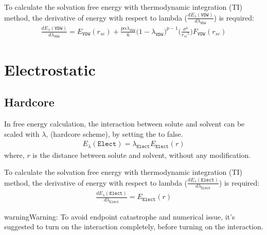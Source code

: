 \documentclass[letterpaper,10pt,english]{sphinxmanual}
\begin{document}
To calculate the solvation free energy with thermodynamic integration (TI) method, the derivative of energy with
respect to lambda (\(\frac{dE_{\lambda}(\texttt{VDW})}{d\lambda_{\texttt{VDW}}}\)) is required:
\begin{equation*}
\begin{split}\frac{dE_{\lambda}(\texttt{VDW})}{d\lambda_{\texttt{VDW}}} = E_{\texttt{VDW}}(r_{sc}) + \frac{p \alpha \lambda_{\texttt{VDW}}}{6} \bigg(1 - \lambda_{\texttt{VDW}}\bigg)^{p-1} \bigg(\frac{{\sigma}^6}{{r_{sc}}^5} \bigg) F_{\texttt{VDW}}(r_{sc})\end{split}
\end{equation*}

\section{Electrostatic}
\label{\detokenize{free_energy:electrostatic}}

\subsection{Hard\sphinxhyphen{}core}
\label{\detokenize{free_energy:hard-core}}
In free energy calculation, the  interaction between solute and solvent can be scaled with \(\lambda\),  (hard\sphinxhyphen{}core scheme),
by setting the  to false.
\begin{equation*}
\begin{split}E_{\lambda}(\texttt{Elect}) = \lambda_{\texttt{Elect}} E_{\texttt{Elect}}(r)\end{split}
\end{equation*}
where, \(r\) is the distance between solute and solvent, without any modification.

To calculate the solvation free energy with thermodynamic integration (TI) method, the derivative of energy with
respect to lambda (\(\frac{dE_{\lambda}(\texttt{Elect})}{d\lambda_{\texttt{Elect}}}\)) is required:
\begin{equation*}
\begin{split}\frac{dE_{\lambda}(\texttt{Elect})}{d\lambda_{\texttt{Elect}}} = E_{\texttt{Elect}}(r)\end{split}
\end{equation*}
\begin{sphinxadmonition}{warning}{Warning:}
To avoid end\sphinxhyphen{}point catastrophe and numerical issue, it’s suggested to turn on the  interaction completely, before turning
on the  interaction.
\end{sphinxadmonition}
\end{document}
